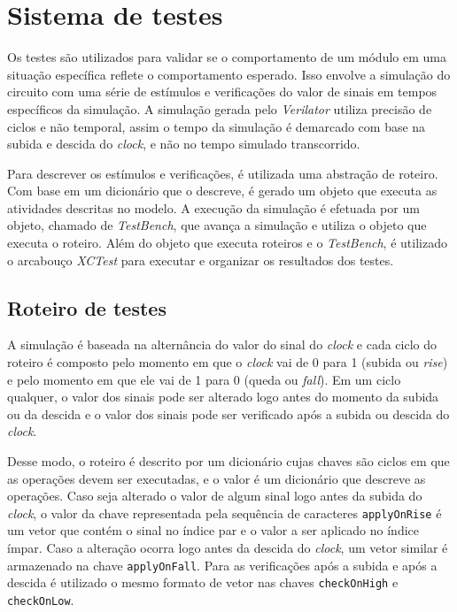 \section{Sistema de testes}
\label{sec:sdt}

Os testes são utilizados para validar se o comportamento de um módulo em uma situação específica reflete o comportamento esperado.
Isso envolve a simulação do circuito com uma série de estímulos e verificações do valor de sinais em tempos específicos da simulação.
A simulação gerada pelo \emph{Verilator} utiliza precisão de ciclos e não temporal, assim o tempo da simulação é demarcado com
base na subida e descida do \emph{clock}, e não no tempo simulado transcorrido.

Para descrever os estímulos e verificações, é utilizada uma abstração de roteiro. Com base em um dicionário que o descreve,
é gerado um objeto que executa as atividades descritas no modelo. 
A execução da simulação é efetuada por um objeto, chamado de \emph{TestBench}, que avança a simulação e utiliza o objeto que executa
o roteiro.
Além do objeto que executa roteiros e o \emph{TestBench}, é utilizado o arcabouço \emph{XCTest} \citep{xctest}
para executar e organizar os resultados dos testes.

\subsection{Roteiro de testes}
\label{ssec:script}

A simulação é baseada na alternância do valor do sinal do \emph{clock} e cada ciclo do roteiro é composto pelo
momento em que o \emph{clock} vai de 0 para 1 (subida ou \emph{rise}) e pelo momento em que ele vai de 1 para 0
(queda ou \emph{fall}).
Em um ciclo qualquer, o valor dos sinais pode ser alterado logo antes do momento da subida ou da descida e o valor
dos sinais pode ser verificado após a subida ou descida do \emph{clock}.

Desse modo, o roteiro é descrito por um dicionário cujas chaves são ciclos em que as operações devem ser executadas,
e o valor é um dicionário que descreve as operações.
Caso seja alterado o valor de algum sinal logo antes da subida do \emph{clock}, o valor da chave representada
pela sequência de caracteres \texttt{applyOnRise} é um vetor que contém o sinal no índice par e o valor a ser aplicado no índice ímpar.
Caso a alteração ocorra logo antes da descida do \emph{clock}, um vetor similar é armazenado na chave \texttt{applyOnFall}.
Para as verificações após a subida e após a descida é utilizado o mesmo formato de vetor nas chaves \texttt{checkOnHigh} e \texttt{checkOnLow}.

